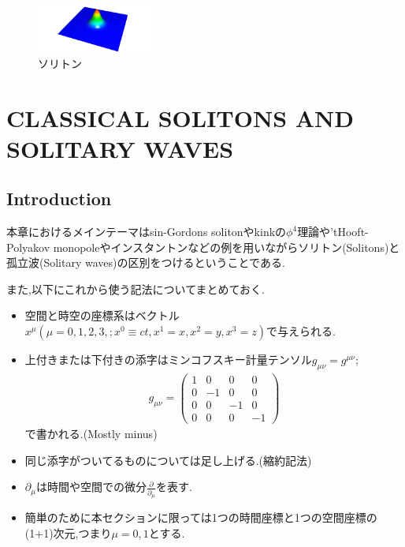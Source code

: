 \documentclass[dvipdfmx,11pt,a4paper]{jsbook}
\begin{document}
\begin{figure}[H]
    \centering
    \includegraphics[width=4cm]{figure/soliton.png}
    \caption{ソリトン}
    \label{soliton}
\end{figure}

\chapter{CLASSICAL SOLITONS AND SOLITARY WAVES}
\section{Introduction}
本章におけるメインテーマはsin-Gordons solitonやkinkの$\phi^4$理論や'tHooft-Polyakov monopoleやインスタントンなどの例を用いながらソリトン(Solitons)と孤立波(Solitary waves)の区別をつけるということである.

また,以下にこれから使う記法についてまとめておく.
\begin{screen}
    \begin{itemize}
        \item 空間と時空の座標系はベクトル$x^{\mu}(\mu=0, 1, 2, 3, ; x^{0}\equiv ct, x^{1}=x, x^{2}=y, x^{3}=z)$で与えられる.
        \item 上付きまたは下付きの添字はミンコフスキー計量テンソル$g_{\mu \nu}=g^{\mu \nu}$;
              \begin{align*}
                  g_{\mu \nu}=
                  \left(\begin{array}{cccc}
                          1 & 0  & 0  & 0  \\
                          0 & -1 & 0  & 0  \\
                          0 & 0  & -1 & 0  \\
                          0 & 0  & 0  & -1
                      \end{array}\right)
              \end{align*}
              で書かれる.(Mostly minus)
        \item 同じ添字がついてるものについては足し上げる.(縮約記法)
        \item $\partial_{\mu}$は時間や空間での微分$\frac{\partial}{\partial_{\mu}}$を表す.
        \item 簡単のために本セクションに限っては1つの時間座標と1つの空間座標の(1+1)次元,つまり$\mu=0,1$とする.
    \end{itemize}
\end{screen}
\end{document}
